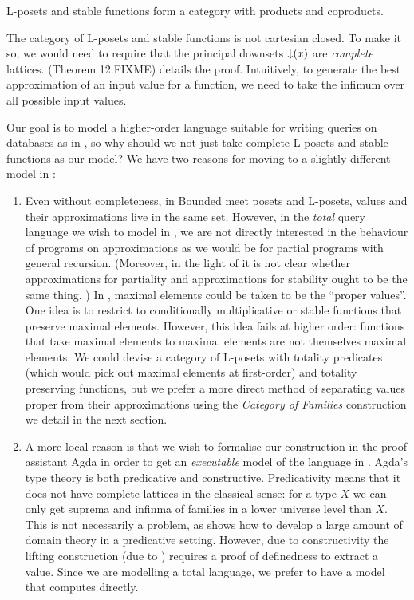 \begin{theorem}
  L-posets and stable functions form a category with products and
  coproducts.
\end{theorem}

The category of L-posets and stable functions is not cartesian
closed. To make it so, we would need to require that the principal
downsets $\mathop{\downarrow}(x)$ are \emph{complete}
lattices. \citet{amadio-curien} (Theorem 12.FIXME) details the proof. Intuitively, to generate the best approximation of an input value for a function, we need to take the infimum over all possible input values.

Our goal is to model a higher-order language suitable for writing
queries on databases as in , so why should
we not just take complete L-posets and stable functions as our model?
We have two reasons for moving to a slightly different model in :

\begin{enumerate}
\item Even without completeness, in Bounded meet posets and L-posets,
  values and their approximations live in the same set. However, in
  the \emph{total} query language we wish to model in
  , we are not directly interested in the behaviour
  of programs on approximations as we would be for partial programs
  with general recursion. (Moreover, in the light of
   it is not clear whether
  approximations for partiality and approximations for stability ought
  to be the same thing. ) In
  , maximal elements could be
  taken to be the ``proper values''. One idea is to restrict to
  conditionally multiplicative or stable functions that preserve
  maximal elements. However, this idea fails at higher order:
  functions that take maximal elements to maximal elements are not
  themselves maximal elements. We could devise a category of L-posets
  with totality predicates (which would pick out maximal elements at
  first-order) and totality preserving functions, but we prefer a more
  direct method of separating values proper from their approximations
  using the \emph{Category of Families} construction we detail in the
  next section.
\item A more local reason is that we wish to formalise our
  construction in the proof assistant Agda \cite{agda} in order to get
  an \emph{executable} model of the language in
  . Agda's type theory is both predicative and
  constructive. Predicativity means that it does not have complete
  lattices in the classical sense: for a type $X$ we can only get
  suprema and infinma of families in a lower universe level than
  $X$. This is not necessarily a problem, as \citet{dejong21} shows
  how to develop a large amount of domain theory in a predicative
  setting. However, due to constructivity the lifting construction
  (due to \citet{escardo-knapp}) requires a proof of definedness to
  extract a value. Since we are modelling a total language, we prefer
  to have a model that computes directly.
\end{enumerate}




